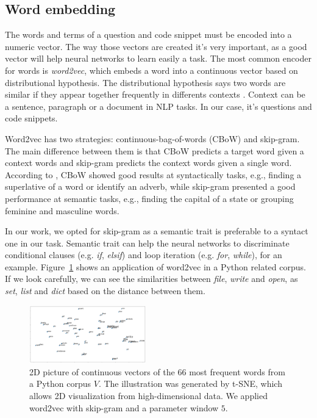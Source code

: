 \documentclass[sigconf]{acmart}
\begin{document}
\subsection{Word embedding}

The words and terms of a question and code snippet must be encoded into a numeric vector. The way those vectors are created it's very important, as a good vector will help neural networks to learn easily a task. The most common encoder for words is \emph{word2vec}, which embeds a word into a continuous vector based on distributional hypothesis. The distributional hypothesis says two words are similar if they appear together frequently in differents contexts \citep{Goodfellow-et-al-2016}. Context can be a sentence, paragraph or a document in NLP tasks. In our case, it's questions and code snippets.

Word2vec has two strategies: continuous-bag-of-words (CBoW) and skip-gram. The main difference between them is that CBoW predicts a target word given a context words and skip-gram predicts the context words given a single word. According to \cite{mikolov2013distributed}, CBoW showed good results at syntactically tasks, e.g., finding a superlative of a word or identify an adverb, while skip-gram presented a good performance at semantic tasks, e.g., finding the capital of a state or grouping feminine and masculine words. 

In our work, we opted for skip-gram as a semantic trait is preferable to a syntact one in our task. Semantic trait can help the neural networks to discriminate conditional clauses (e.g. \emph{if}, \emph{elsif}) and loop iteration (e.g. \emph{for}, \emph{while}), for an example. Figure~\ref{fig:tsne-code-snippet-python} shows an application of word2vec in a Python related corpus. If we look carefully, we can see the similarities between \emph{file}, \emph{write} and \emph{open}, as \emph{set}, \emph{list} and \emph{dict} based on the distance between them.

\begin{figure}[H]
\includegraphics[width=0.45\textwidth]{figuras/code_tsne.png}
\caption{2D picture of continuous vectors of the 66 most frequent words from a Python corpus $V$. The illustration was generated by t-SNE, which allows 2D visualization from high-dimensional data. We applied word2vec with skip-gram and a parameter window $5$.}

\label{fig:tsne-code-snippet-python}
\end{figure}
\end{document}
